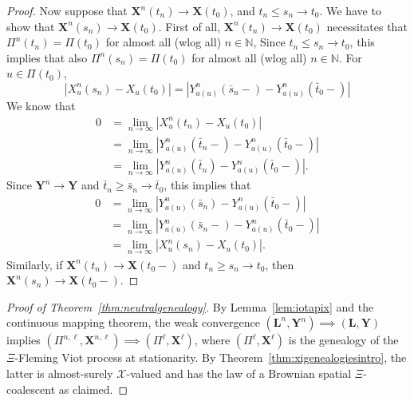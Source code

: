 \documentclass[reqno,draft]{amsart}
\numberwithin{equation}{section}
\theoremstyle{plain}
\theoremstyle{remark}
\newcommand{\N}{\mathbb{N}} %
\newcommand{\fpart}{\Pi} %
\begin{document}
\begin{proof}
    Now suppose that $\boldsymbol X^n(t_n) \to \boldsymbol X(t_0)$, and $t_n \le s_n \to t_0$. We have to show that  $\boldsymbol X^n(s_n) \to \boldsymbol X(t_0)$. First of all, $\boldsymbol X^n(t_n) \to \boldsymbol X(t_0)$ necessitates that $\fpart^n(t_n) = \fpart(t_0)$ for almost all (wlog all) $n\in \N$,
    Since $t_n \le s_n \to t_0$, this implies that also $\fpart^n(s_n) = \fpart(t_0)$ for almost all (wlog all) $n\in \N$.
    For $u\in \fpart(t_0)$, \[
        \left| X^n_u(s_n) - X_u(t_0) \right| = \left| Y^n_{a(u)}(\bar{s}_n-) - Y^n_{a(u)}(\bar{t}_0-) \right|
    \] We know that
    \begin{align*}
        0 &= \lim_{n\to \infty} \left| X^n_u(t_n) - X_u(t_0) \right| \\
        &= \lim_{n\to \infty} \left| Y^n_{a(u)}(\bar{t}_n-) - Y^n_{a(u)}(\bar{t}_0-) \right| \\
        &= \lim_{n\to \infty} \left| Y^n_{a(u)}(\bar{t}_n) - Y^n_{a(u)}(\bar{t}_0-) \right| .
    \end{align*}
    Since $\boldsymbol Y^n \to \boldsymbol Y$ and $\bar{t}_n \ge \bar{s}_n \to \bar{t}_0$, this implies that
    \begin{align*}
        0 &= \lim_{n\to \infty}  \left| Y^n_{a(u)}(\bar{s}_n) - Y^n_{a(u)}(\bar{t}_0-) \right|\\
          &= \lim_{n\to \infty}  \left| Y^n_{a(u)}(\bar{s}_n-) - Y^n_{a(u)}(\bar{t}_0-) \right|\\
          &= \lim_{n\to \infty} \left| X^n_u(s_n) - X_u(t_0) \right|.
    \end{align*}
    Similarly, if $\boldsymbol X^n(t_n) \to \boldsymbol X(t_0-)$ and $t_n \ge s_n \to t_0$, then $\boldsymbol X^n(s_n) \to \boldsymbol X(t_0-)$.
\end{proof}

\begin{proof}[Proof of Theorem~\ref{thm:neutralgenealogy}]
    By Lemma~\ref{lem:iotapix} and the continuous mapping theorem, the weak convergence $(\boldsymbol L^n,\boldsymbol Y^n) \implies (\boldsymbol L,\boldsymbol Y)$ implies $(\fpart^{n,\ell},\boldsymbol X^{n,\ell}) \implies (\fpart^\ell,\boldsymbol X^\ell)$, where $(\fpart^\ell,\boldsymbol X^\ell)$ is the genealogy of the $\Xi$-Fleming Viot process at stationarity. By Theorem~\ref{thm:xigenealogiesintro}, the latter is almost-surely $\mathcal{X}$-valued and has the law of a Brownian spatial $\Xi$-coalescent as claimed.
\end{proof}
\end{document}
